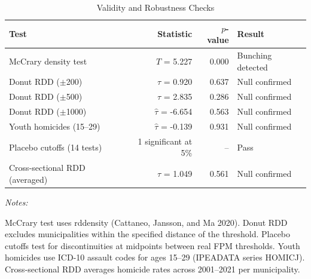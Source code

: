 \begin{table}[!h]
\centering
\small
\caption{\label{tab:validity}Validity and Robustness Checks}
\centering
\small
\begin{threeparttable}
\begin{tabular}[t]{lrrl}
\toprule
Test & Statistic & $p$-value & Result\\
\midrule
McCrary density test & $T$ = 5.227 & 0.000 & Bunching detected\\
Donut RDD ($\pm$200) & $\hat{\tau}$ = 0.920 & 0.637 & Null confirmed\\
Donut RDD ($\pm$500) & $\hat{\tau}$ = 2.835 & 0.286 & Null confirmed\\
Donut RDD ($\pm$1000) & $\hat{\tau}$ = -6.654 & 0.563 & Null confirmed\\
Youth homicides (15--29) & $\hat{\tau}$ = -0.139 & 0.931 & Null confirmed\\
\addlinespace
Placebo cutoffs (14 tests) & 1 significant at 5\% & -- & Pass\\
Cross-sectional RDD (averaged) & $\hat{\tau}$ = 1.049 & 0.561 & Null confirmed\\
\bottomrule
\end{tabular}
\begin{tablenotes}
\item \textit{Notes:} 
\item McCrary test uses rddensity (Cattaneo, Jansson, and Ma 2020). Donut RDD excludes municipalities within the specified distance of the threshold. Placebo cutoffs test for discontinuities at midpoints between real FPM thresholds. Youth homicides use ICD-10 assault codes for ages 15--29 (IPEADATA series HOMICJ). Cross-sectional RDD averages homicide rates across 2001--2021 per municipality.
\end{tablenotes}
\end{threeparttable}
\end{table}

